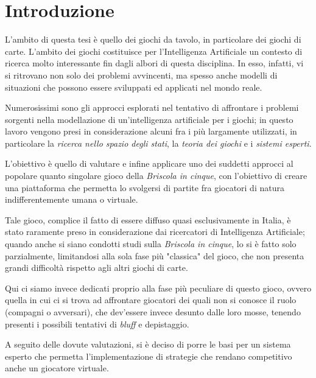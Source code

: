 \chapter*{Introduzione}

\ifpdf
    \graphicspath{{Introduction/IntroductionFigs/PNG/}{Introduction/IntroductionFigs/PDF/}{Introduction/IntroductionFigs/}}
\else
    \graphicspath{{Introduction/IntroductionFigs/EPS/}{Introduction/IntroductionFigs/}}
\fi

L'ambito di questa tesi è quello dei giochi da tavolo, in particolare dei giochi di carte.
L'ambito dei giochi costituisce per l'Intelligenza Artificiale un contesto di ricerca molto interessante fin dagli albori di questa disciplina.
In esso, infatti, vi si ritrovano non solo dei problemi avvincenti, ma spesso anche modelli di situazioni che possono essere sviluppati ed applicati nel mondo reale.


Numerosissimi sono gli approcci esplorati nel tentativo di affrontare i problemi sorgenti nella modellazione di un'intelligenza artificiale per i giochi; in questo lavoro vengono presi in considerazione alcuni fra i più largamente utilizzati, in particolare la \emph{ricerca nello spazio degli stati}, la \emph{teoria dei giochi} e i \emph{sistemi esperti}.

L'obiettivo è quello di valutare e infine applicare uno dei suddetti approcci al popolare quanto singolare gioco della \emph{Briscola in cinque}, con l'obiettivo di creare una piattaforma che permetta lo svolgersi di partite fra giocatori di natura indifferentemente umana o virtuale.

Tale gioco, complice il fatto di essere diffuso quasi esclusivamente in Italia, è stato raramente preso in considerazione dai ricercatori di Intelligenza Artificiale; quando anche si siano condotti studi sulla \emph{Briscola in cinque}, lo si è fatto solo parzialmente, limitandosi alla sola fase più "classica" del gioco, che non presenta grandi difficoltà rispetto agli altri giochi di carte.

Qui ci siamo invece dedicati proprio alla fase più peculiare di questo gioco, ovvero quella in cui ci si trova ad affrontare giocatori dei quali non si conosce il ruolo (compagni o avversari), che dev'essere invece desunto dalle loro mosse, tenendo presenti i possibili tentativi di \emph{bluff} e depistaggio.

A seguito delle dovute valutazioni, si è deciso di porre le basi per un sistema esperto che permetta l'implementazione di strategie che rendano competitivo anche un giocatore virtuale.





